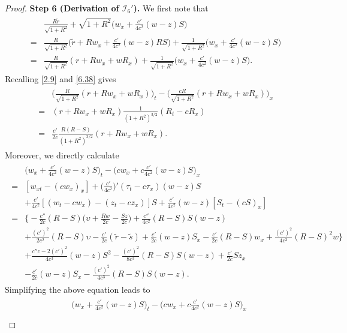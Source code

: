 \documentclass[11pt,reqno]{article}
\newcommand{\fr}{\frac}
\numberwithin{equation}{section}
\begin{document}
\begin{proof}
\textbf{Step 6 (Derivation of $\mathcal{I}_{6}'$).} We first note that
\begin{align}\label{6.48}
\begin{split}
&\fr{R\tilde{r}}{\sqrt{1+R^2}} +\sqrt{1+R^2}\Big(w_x+\fr{c'}{4c^2}(w-z)S\Big) \\
=&\fr{R}{\sqrt{1+R^2}}\Big(\tilde{r}+Rw_x+\fr{c'}{4c^2}(w-z)RS\Big) +\fr{1}{\sqrt{1+R^2}}\Big(w_x+\fr{c'}{4c^2}(w-z)S\Big)\\
=&\fr{R}{\sqrt{1+R^2}}(r+Rw_x+wR_x) +\fr{1}{\sqrt{1+R^2}}\Big(w_x+\fr{c'}{4c^2}(w-z)S\Big).
\end{split}
\end{align}
Recalling \eqref{2.9} and \eqref{6.38} gives
\begin{align}\label{6.49}
\begin{split}
&\Big(\fr{R}{\sqrt{1+R^2}}(r+Rw_x+wR_x)\Big)_t - \Big(\fr{cR}{\sqrt{1+R^2}}(r+Rw_x+wR_x)\Big)_x \\
=& (r+Rw_x+wR_x)\fr{1}{(1+R^2)^{3/2}}(R_t-cR_x) \\
=& \fr{c'}{2c}\fr{R(R-S)}{(1+R^2)^{3/2}}(r+Rw_x+wR_x).
\end{split}
\end{align}
Moreover, we directly calculate
\begin{align*}
\begin{split}
&\Big(w_x+\fr{c'}{4c^2}(w-z)S\Big)_t-\Big(cw_x+c\fr{c'}{4c^2}(w-z)S\Big)_x \\
=& [w_{xt}-(cw_x)_x] +\Big(\fr{c'}{4c^2}\Big)'(\tau_t-c\tau_x)(w-z)S \\
&+\fr{c'}{4c^2}[(w_t-cw_x)-(z_t-cz_x)]S +\fr{c'}{4c^2}(w-z)[S_t-(cS)_x] \\
=& \bigg\{-\fr{c''}{2c}(R-S)\Big(\upsilon+\fr{Rw}{2c}-\fr{Sz}{2c}\Big) +\fr{c''}{4c^2}(R-S)S(w-z) \\ &+\fr{(c')^2}{2c^2}(R-S)\upsilon -\fr{c'}{2c}(\tilde{r}-\tilde{s}) +\fr{c'}{2c}(w-z)S_x -\fr{c'}{2c}(R-S)w_x +\fr{(c')^2}{4c^3}(R-S)^2w \bigg\} \\
&+\fr{c''c-2(c')^2}{4c^3}(w-z)S^2 -\fr{(c')^2}{8c^3}(R-S)S(w-z) +\fr{c'}{2c}Sz_x \\
&-\fr{c'}{2c}(w-z)S_x -\fr{(c')^2}{4c^3}(R-S)S(w-z).
\end{split}
\end{align*}
Simplifying the above equation leads to
\begin{align}\label{6.50}
\begin{split}
&\Big(w_x+\fr{c'}{4c^2}(w-z)S\Big)_t-\Big(cw_x+c\fr{c'}{4c^2}(w-z)S\Big)_x \\

\end{split}
\end{align}
\end{proof}
\end{document}
